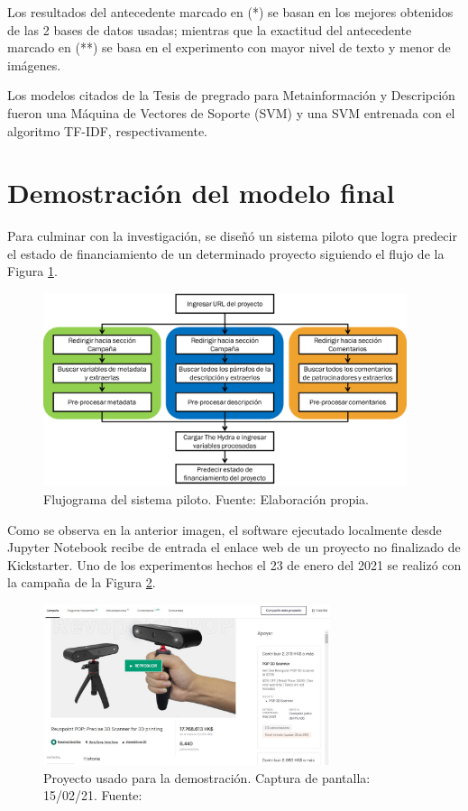 Los resultados del antecedente marcado en (*) se basan en los mejores obtenidos de las 2 bases de datos usadas; mientras que la exactitud del antecedente marcado en (**) se basa en el experimento con mayor nivel de texto y menor de imágenes.

Los modelos citados de la Tesis de pregrado para Metainformación y Descripción fueron una Máquina de Vectores de Soporte (SVM) y una SVM entrenada con el algoritmo TF-IDF, respectivamente.

\section{Demostración del modelo final}
Para culminar con la investigación, se diseñó un sistema piloto que logra predecir el estado de financiamiento de un determinado proyecto siguiendo el flujo de la Figura \ref{5:fig13}.

\begin{figure}[h]
	\begin{center}
		\includegraphics[width=0.95\textwidth]{5/figures/demo_flux.png}
		\caption{Flujograma del sistema piloto. Fuente: Elaboración propia.}
		\label{5:fig13}
	\end{center}
\end{figure}

Como se observa en la anterior imagen, el software ejecutado localmente desde Jupyter Notebook recibe de entrada el enlace web de un proyecto no finalizado de Kickstarter. Uno de los experimentos hechos el 23 de enero del 2021 se realizó con la campaña de la Figura \ref{5:fig14}.

\begin{figure}[!ht]
	\begin{center}
		\includegraphics[width=0.75\textwidth]{5/figures/example_project_150221.jpg}
		\caption{Proyecto usado para la demostración. Captura de pantalla: 15/02/21. Fuente: \cite{ot_kickstarter_revopointproject}}
		\label{5:fig14}
	\end{center}
\end{figure}

